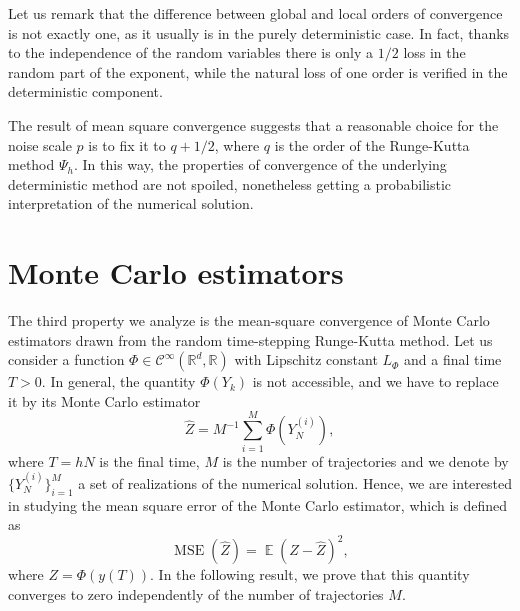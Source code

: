 \documentclass{siamart1116}
\numberwithin{theorem}{section}
\newcommand{\R}{\mathbb{R}}
\newcommand{\E}{\operatorname{\mathbb{E}}}
\newcommand{\MSE}{\operatorname{MSE}}
\newcommand{\sksum}{{\textstyle\sum}}
\begin{document}
\begin{remark} Let us remark that the difference between global and local orders of convergence is not exactly one, as it usually is in the purely deterministic case. In fact, thanks to the independence of the random variables there is only a $1/2$ loss in the random part of the exponent, while the natural loss of one order is verified in the deterministic component.
\end{remark}
\begin{remark} The result of mean square convergence suggests that a reasonable choice for the noise scale $p$ is to fix it to  $q + 1/2$, where $q$ is the order of the Runge-Kutta method $\Psi_h$. In this way, the properties of convergence of the underlying deterministic method are not spoiled, nonetheless getting a probabilistic interpretation of the numerical solution.
\end{remark}


\section{Monte Carlo estimators}\label{sec:MonteCarlo}

The third property we analyze is the mean-square convergence of Monte Carlo estimators drawn from the random time-stepping Runge-Kutta method. Let us consider a function $\Phi\in\mathcal{C}^\infty(\R^d, \R)$ with Lipschitz constant $L_\Phi$ and a final time $T > 0$. In general, the quantity $\Phi(Y_k)$ is not accessible, and we have to replace it by its Monte Carlo estimator 
\begin{equation}\label{eq:MSE}
	\hat Z = M^{-1} \sksum_{i = 1}^M \Phi(Y_N^{(i)}),
\end{equation}
where $T = hN$ is the final time, $M$ is the number of trajectories and we denote by $\{Y_N^{(i)}\}_{i=1}^M$ a set of realizations of the numerical solution. Hence, we are interested in studying the mean square error of the Monte Carlo estimator, which is defined as
\begin{equation}
	\MSE(\hat Z) = \E(Z - \hat Z)^2,
\end{equation}
where $Z = \Phi(y(T))$. In the following result, we prove that this quantity converges to zero independently of the number of trajectories $M$.
\end{document}
